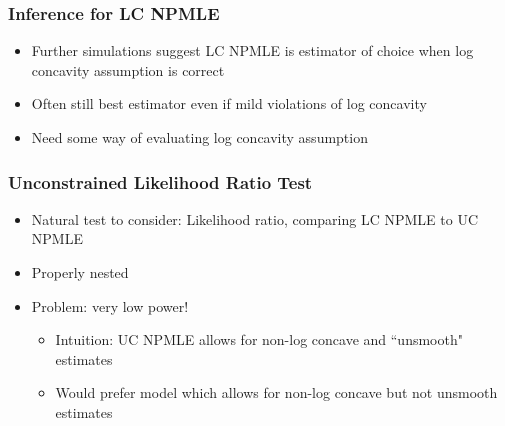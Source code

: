 \documentclass[compress,red]{beamer}
\begin{document}
\begin{frame}

	\frametitle{Inference for LC NPMLE}
	
	\begin{itemize}
	
	\item Further simulations suggest LC NPMLE is estimator of choice when log concavity assumption is correct
	
	\item Often still best estimator even if mild violations of log concavity 
	
	\item Need some way of evaluating log concavity assumption
	
	\end{itemize}

\end{frame}

\begin{frame}

	\frametitle{Unconstrained Likelihood Ratio Test}

	\begin{itemize}
	
	\item Natural test to consider: Likelihood ratio, comparing LC NPMLE to UC NPMLE
	
	\item Properly nested
	
	\item Problem: very low power!
	
		\begin{itemize}
		
		\item Intuition: UC NPMLE allows for non-log concave and ``unsmooth" estimates
		
		\item Would prefer model which allows for non-log concave but not unsmooth estimates
		
		\end{itemize}
	
	\end{itemize}

\end{frame}
\end{document}
